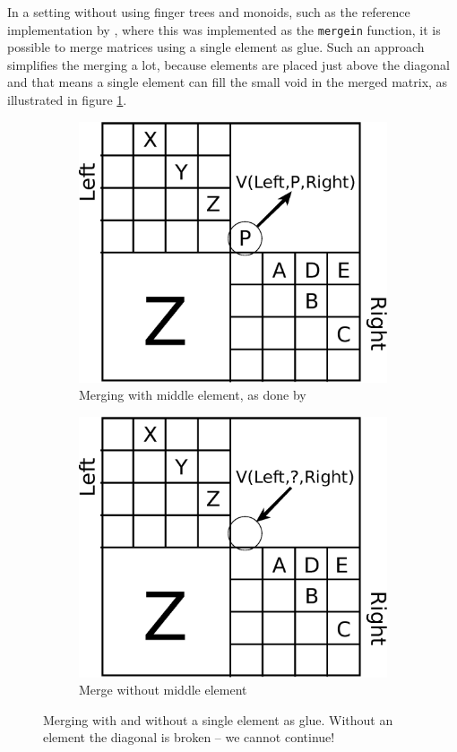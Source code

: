 \documentclass[a4paper,12pt,twosided]{report}
\begin{document}
In a setting without using finger trees and monoids, such as the reference
implementation by \citet{parparsepaper}, where this was implemented as
the \texttt{mergein} function, it is possible to merge matrices using a single
element as glue. Such an approach simplifies the merging a lot, because elements
are placed just above the diagonal and that means a single element can fill the
small void in the merged matrix, as illustrated in figure \ref{mergein}.

\begin{figure}[H]
\centering
\begin{subfigure}[H]{.45\textwidth}
\includegraphics[width=.9\textwidth]{merge-with-element.eps}
\caption{Merging with middle element, as done by \citet{parparsepaper}}
\end{subfigure}
\hfill
\begin{subfigure}[H]{.45\textwidth}
\includegraphics[width=.9\textwidth]{merge-without-element.eps}
\caption{Merge without middle element}
\end{subfigure}
\caption{\label{mergein}Merging with and without a single element as glue.
Without an element the diagonal is broken -- we cannot continue!}
\end{figure}
\end{document}
